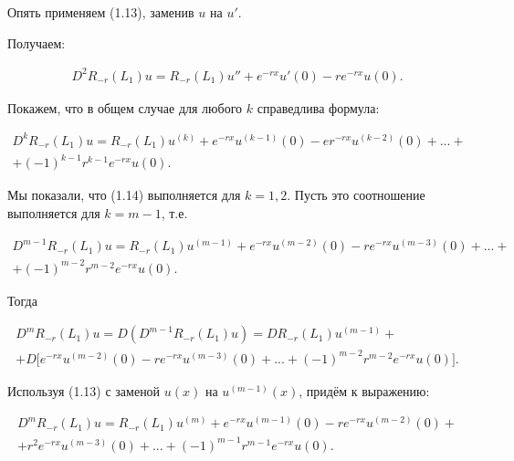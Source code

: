 Опять применяем (1.13), заменив $ u $ на $ u' $.

Получаем:

\begin{equation}
\begin{array}{c}
\nonumber

D^2R_{-r}(L_1)u = R_{-r}(L_1)u'' + e^{-rx}u'(0) - re^{-rx}u(0).

\end{array}
\end{equation}

Покажем, что в общем случае для любого $ k $ справедлива формула:

\begin{equation}
\begin{array}{c}

D^kR_{-r}(L_1)u = R_{-r}(L_1)u^{(k)} + e^{-rx}u^{(k-1)}(0) -er^{-rx}u^{(k-2)}(0) + ... + \\
+ (-1)^{k-1}r^{k-1}e^{-rx}u(0).

\end{array}
\end{equation}

Мы показали, что (1.14) выполняется для $ k = 1,2 $. Пусть это соотношение выполняется для $ k = m - 1 $, т.е.

\begin{equation}
\begin{array}{c}
\nonumber

D^{m-1}R_{-r}(L_1)u = R_{-r}(L_1)u^{(m-1)} + e^{-rx}u^{(m-2)}(0) - re^{-rx}u^{(m-3)}(0) + ... + \\
+ (-1)^{m-2}r^{m-2}e^{-rx}u(0).

\end{array}
\end{equation}

Тогда

\begin{equation}
\begin{array}{c}
\nonumber

D^mR_{-r}(L_1)u = D(D^{m-1}R_{-r}(L_1)u) = DR_{-r}(L_1)u^{(m-1)} + \\
+ D\bigl[e^{-rx}u^{(m-2)}(0) - re^{-rx}u^{(m-3)}(0) + ... + (-1)^{m-2}r^{m-2}e^{-rx}u(0)\bigr].

\end{array}
\end{equation}

Используя (1.13) с заменой $ u(x) $ на $ u^{(m-1)}(x) $, придём к выражению:

\begin{equation}
\begin{array}{c}
\nonumber

D^mR_{-r}(L_1)u = R_{-r}(L_1)u^{(m)} + e^{-rx}u^{(m-1)}(0) - re^{-rx}u^{(m-2)}(0) + \\
+ r^2e^{-rx}u^{(m-3)}(0) + ... + (-1)^{m-1}r^{m-1}e^{-rx}u(0).

\end{array}
\end{equation}

